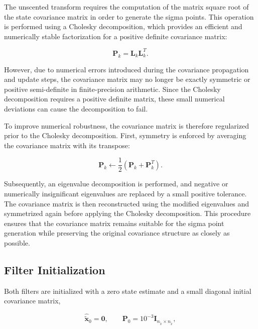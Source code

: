 The unscented transform requires the computation of the matrix square root of the state covariance matrix in order to generate the sigma points. This operation is performed using a Cholesky decomposition, which provides an efficient and numerically stable factorization for a positive definite covariance matrix:

\begin{equation}
	\bm{P}_k
	=
	\bm{L}_k \bm{L}_k^T .
\end{equation}

However, due to numerical errors introduced during the covariance propagation and update steps, the covariance matrix may no longer be exactly symmetric or positive semi-definite in finite-precision arithmetic. Since the Cholesky decomposition requires a positive definite matrix, these small numerical deviations can cause the decomposition to fail.

To improve numerical robustness, the covariance matrix is therefore regularized prior to the Cholesky decomposition. First, symmetry is enforced by averaging the covariance matrix with its transpose:

\begin{equation}
	\bm{P}_k
	\leftarrow
	\frac{1}{2}
	\left(
	\bm{P}_k
	+
	\bm{P}_k^T
	\right).
\end{equation}

Subsequently, an eigenvalue decomposition is performed, and negative or numerically insignificant eigenvalues are replaced by a small positive tolerance. The covariance matrix is then reconstructed using the modified eigenvalues and symmetrized again before applying the Cholesky decomposition. This procedure ensures that the covariance matrix remains suitable for the sigma point generation while preserving the original covariance structure as closely as possible.





\subsection{Filter Initialization}
\label{sec:3.1.7Initialization}

Both filters are initialized with a zero state estimate and a small diagonal initial covariance matrix,

\begin{equation}
	\hat{\tilde{\bm{x}}}_0 = \bm{0},
	\qquad
	\bm{P}_0 = 10^{-3} \bm{I}_{n_{\tilde{x}} \times n_{\tilde{x}}},
\end{equation}

